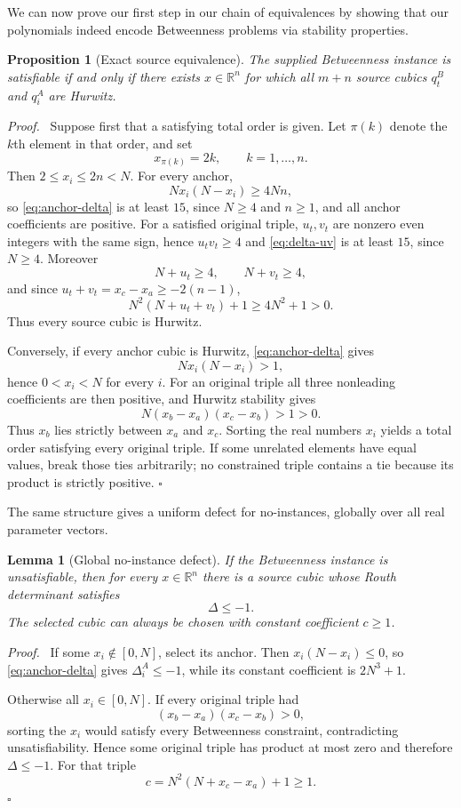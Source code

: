 \documentclass[final,5p,times,twocolumn]{elsarticle}
\newcommand{\R}{\mathbb R}
\newtheorem{lemma}[theorem]{Lemma}
\newtheorem{proposition}[theorem]{Proposition}
\newenvironment{proof}[1][Proof]
  {\par\smallskip\noindent\textit{#1.}\ }
  {\hfill$\square$\par\smallskip}
\begin{document}
We can now prove our first step in our chain of equivalences by showing that our polynomials indeed encode Betweenness problems via stability properties.

\begin{proposition}[Exact source equivalence]\label{prop:source}
The supplied Betweenness instance is satisfiable if and only if there exists $x\in\R^n$ for which all $m+n$ source cubics $q_t^B$ and $q_i^A$ are Hurwitz.
\end{proposition}

\begin{proof}
Suppose first that a satisfying total order is given. Let $\pi(k)$ denote the $k$th element in that order, and set
\[
x_{\pi(k)}=2k,\qquad k=1,\ldots,n.
\]
Then $2\le x_i\le2n<N$. For every anchor,
\[
Nx_i(N-x_i)\ge4Nn,
\]
so \eqref{eq:anchor-delta} is at least $15$, since $N\ge4$ and $n\ge1$, and all anchor coefficients are positive. For a satisfied original triple, $u_t,v_t$ are nonzero even integers with the same sign, hence $u_tv_t\ge4$ and \eqref{eq:delta-uv} is at least $15$, since $N\ge4$. Moreover
\[
N+u_t\ge4,\qquad N+v_t\ge4,
\]
and since $u_t+v_t=x_c-x_a\ge-2(n-1)$,
\[
N^2(N+u_t+v_t)+1\ge4N^2+1>0.
\]
Thus every source cubic is Hurwitz.

Conversely, if every anchor cubic is Hurwitz, \eqref{eq:anchor-delta} gives
\[
Nx_i(N-x_i)>1,
\]
hence $0<x_i<N$ for every $i$. For an original triple all three nonleading coefficients are then positive, and Hurwitz stability gives
\[
N(x_b-x_a)(x_c-x_b)>1>0.
\]
Thus $x_b$ lies strictly between $x_a$ and $x_c$. Sorting the real numbers $x_i$ yields a total order satisfying every original triple. If some unrelated elements have equal values, break those ties arbitrarily; no constrained triple contains a tie because its product is strictly positive.
\end{proof}

The same structure gives a uniform defect for no-instances, globally over all real parameter vectors.

\begin{lemma}[Global no-instance defect]\label{lem:global-defect}
If the Betweenness instance is unsatisfiable, then for every $x\in\R^n$ there is a source cubic whose Routh determinant satisfies
\[
\Delta\le-1.
\]
The selected cubic can always be chosen with constant coefficient $c\ge1$.
\end{lemma}

\begin{proof}
If some $x_i\notin[0,N]$, select its anchor. Then $x_i(N-x_i)\le0$, so \eqref{eq:anchor-delta} gives $\Delta_i^A\le-1$, while its constant coefficient is $2N^3+1$.

Otherwise all $x_i\in[0,N]$. If every original triple had
\[
(x_b-x_a)(x_c-x_b)>0,
\]
sorting the $x_i$ would satisfy every Betweenness constraint, contradicting unsatisfiability. Hence some original triple has product at most zero and therefore $\Delta\le-1$. For that triple
\[
c=N^2(N+x_c-x_a)+1\ge1.
\]
\end{proof}
\end{document}
